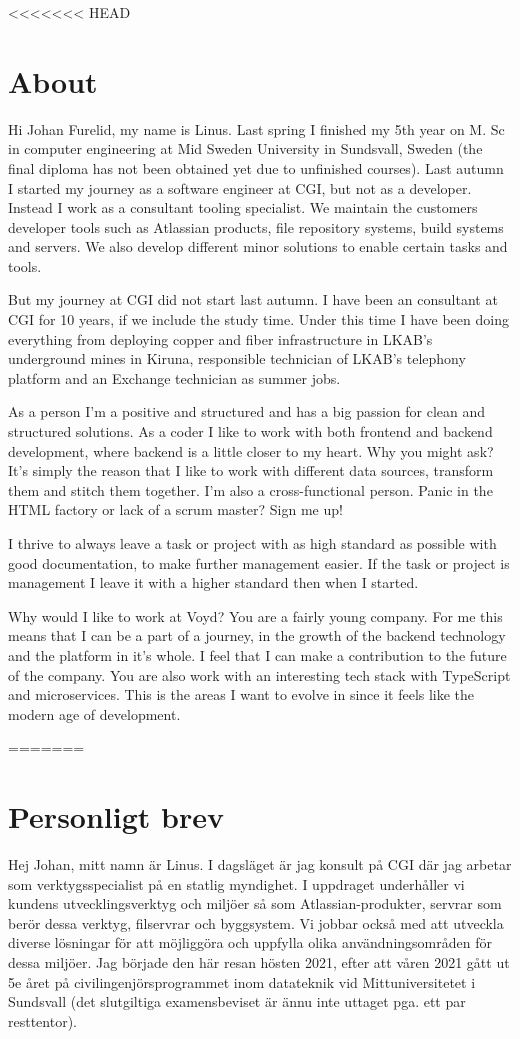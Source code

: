 <<<<<<< HEAD
\section{About}
Hi Johan Furelid, my name is Linus. 
Last spring I finished my 5th year on M. Sc in computer engineering at Mid Sweden University in Sundsvall, Sweden (the final diploma has not been obtained yet due to unfinished courses).
Last autumn I started my journey as a software engineer at CGI, but not as a developer.
Instead I work as a consultant tooling specialist.
We maintain the customers developer tools such as Atlassian products, file repository systems, build systems and servers.
We also develop different minor solutions to enable certain tasks and tools. 

But my journey at CGI did not start last autumn. I have been an consultant at CGI for 10 years, if we include the study time.
Under this time I have been doing everything from deploying copper and fiber infrastructure in LKAB's underground mines in Kiruna, responsible technician of LKAB's telephony platform and an Exchange technician as summer jobs.

\bigskip

As a person I'm a positive and structured and has a big passion for clean and structured solutions.
As a coder I like to work with both frontend and backend development, where backend is a little closer to my heart.
Why you might ask? It's simply the reason that I like to work with different data sources, transform them and stitch them together.
I'm also a cross-functional person. Panic in the HTML factory or lack of a scrum master? Sign me up!

I thrive to always leave a task or project with as high standard as possible with good documentation, to make further management easier. 
If the task or project is management I leave it with a higher standard then when I started.

\bigskip

Why would I like to work at Voyd?
You are a fairly young company.
For me this means that I can be a part of a journey, in the growth of the backend technology and the platform in it's whole.
I feel that I can make a contribution to the future of the company.
You are also work with an interesting tech stack with TypeScript and microservices.
This is the areas I want to evolve in since it feels like the modern age of development.

=======
\section{Personligt brev}
Hej Johan, mitt namn är Linus.
I dagsläget är jag konsult på CGI där jag arbetar som verktygsspecialist på en statlig myndighet.
I uppdraget underhåller vi kundens utvecklingsverktyg och miljöer så som Atlassian-produkter, servrar som berör dessa verktyg, filservrar och byggsystem.
Vi jobbar också med att utveckla diverse lösningar för att möjliggöra och uppfylla olika användningsområden för dessa miljöer.
Jag började den här resan hösten 2021, efter att våren 2021 gått ut 5e året på civilingenjörsprogrammet inom datateknik vid Mittuniversitetet i Sundsvall (det slutgiltiga examensbeviset är ännu inte uttaget pga. ett par resttentor).


